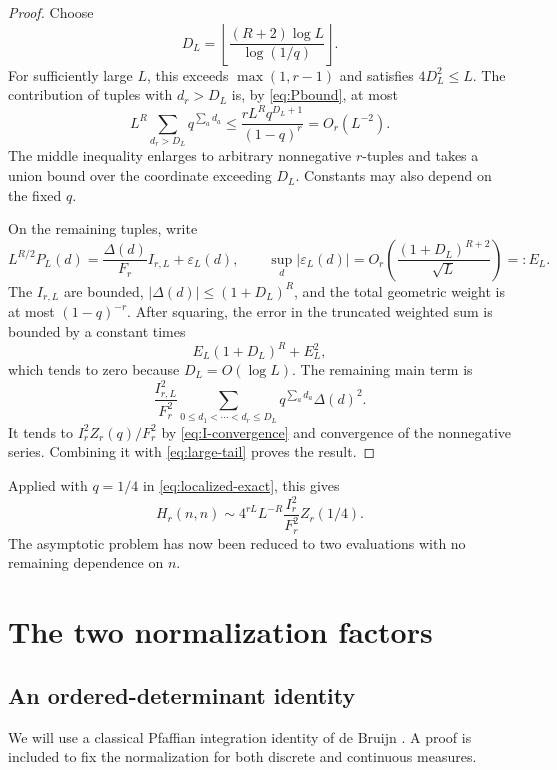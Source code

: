\documentclass[11pt]{article}
\numberwithin{equation}{section}
\theoremstyle{definition}
\newcommand{\vander}{\Delta}
\begin{document}
\begin{proof}
Choose
\[
 D_L=\left\lfloor\frac{(R+2)\log L}{\log(1/q)}\right\rfloor.
\]
For sufficiently large $L$, this exceeds $\max(1,r-1)$ and satisfies $4D_L^2\leq L$. The contribution of tuples with $d_r>D_L$ is, by \eqref{eq:Pbound}, at most
\begin{equation}\label{eq:large-tail}
 L^R\sum_{d_r>D_L}q^{\sum_a d_a}
 \leq\frac{rL^Rq^{D_L+1}}{(1-q)^r}=O_r(L^{-2}).
\end{equation}
The middle inequality enlarges to arbitrary nonnegative $r$-tuples and takes a union bound over the coordinate exceeding $D_L$. Constants may also depend on the fixed $q$.

On the remaining tuples, write
\[
 L^{R/2}P_L(d)=\frac{\vander(d)}{F_r}I_{r,L}+\varepsilon_L(d),
 \qquad \sup_d|\varepsilon_L(d)|
 =O_r\!\left(\frac{(1+D_L)^{R+2}}{\sqrt L}\right)=:E_L.
\]
The $I_{r,L}$ are bounded, $|\vander(d)|\leq(1+D_L)^R$, and the total geometric weight is at most $(1-q)^{-r}$. After squaring, the error in the truncated weighted sum is bounded by a constant times
\[
 E_L(1+D_L)^R+E_L^2,
\]
which tends to zero because $D_L=O(\log L)$. The remaining main term is
\[
 \frac{I_{r,L}^2}{F_r^2}
 \sum_{0\leq d_1<\cdots<d_r\leq D_L}q^{\sum_a d_a}\vander(d)^2.
\]
It tends to $I_r^2Z_r(q)/F_r^2$ by \eqref{eq:I-convergence} and convergence of the nonnegative series. Combining it with \eqref{eq:large-tail} proves the result.
\end{proof}

Applied with $q=1/4$ in \eqref{eq:localized-exact}, this gives
\begin{equation}\label{eq:before-evaluation}
 H_r(n,n)\sim4^{rL}L^{-R}\frac{I_r^2}{F_r^2}Z_r(1/4).
\end{equation}
The asymptotic problem has now been reduced to two evaluations with no remaining dependence on $n$.

\section{The two normalization factors}\label{sec:normalizations}

\subsection{An ordered-determinant identity}
We will use a classical Pfaffian integration identity of de Bruijn \cite{deBruijn}. A proof is included to fix the normalization for both discrete and continuous measures.
\end{document}
